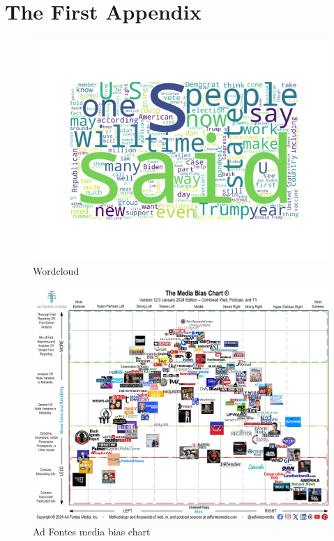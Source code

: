 \chapter{The First Appendix}
\label{app:A}

\begin{figure}[htbp]
    \centering
    \includegraphics[width=0.7\linewidth]{figures/wordcloud_vx.png}
    \caption{Wordcloud}
    \label{fig:wordcloud}
\end{figure}




\begin{figure}[htbp]
    \centering
    \includegraphics[width=0.8\linewidth]{images/Media-Bias-Chart-12.0_Jan-2024-Licensed-scaled.jpg}
    \caption{Ad Fontes media bias chart}
    \label{fig:adfontes-media-bias-chart}
\end{figure}


